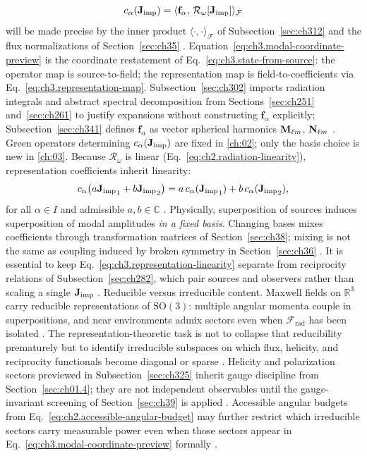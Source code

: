 \begin{equation}
\label{eq:ch3.coefficient-functional}
c_\alpha(\mathbf{J}_{\mathrm{imp}})
=
\langle \mathbf{f}_\alpha,\,\mathcal{R}_\omega[\mathbf{J}_{\mathrm{imp}}]\rangle_{\mathcal{F}}
\end{equation}
will be made precise by the inner product \(\langle\cdot,\cdot\rangle_{\mathcal{F}}\) of Subsection~\ref{sec:ch312} and the flux normalizations of Section~\ref{sec:ch35} . Equation~\eqref{eq:ch3.modal-coordinate-preview} is the coordinate restatement of Eq.~\eqref{eq:ch3.state-from-source}: the operator map is source-to-field; the representation map is field-to-coefficients via Eq.~\eqref{eq:ch3.representation-map}. Subsection~\ref{sec:ch302} imports radiation integrals and abstract spectral decomposition from Sections~\ref{sec:ch251} and~\ref{sec:ch261} to justify expansions without constructing \(\mathbf{f}_\alpha\) explicitly; Subsection~\ref{sec:ch341} defines \(\mathbf{f}_\alpha\) as vector spherical harmonics \(\mathbf{M}_{\ell m}\), \(\mathbf{N}_{\ell m}\) . Green operators determining \(c_\alpha(\mathbf{J}_{\mathrm{imp}})\) are fixed in \ref{ch:02}; only the basis choice is new in \ref{ch:03}.
Because \(\mathcal{R}_\omega\) is linear (Eq.~\eqref{eq:ch2.radiation-linearity}), representation coefficients inherit linearity:
\begin{equation}
\label{eq:ch3.representation-linearity}
c_\alpha\big(a{\mathbf{J}_{\mathrm{imp}}}_1+b{\mathbf{J}_{\mathrm{imp}}}_2\big)
=
a\,c_\alpha({\mathbf{J}_{\mathrm{imp}}}_1)+b\,c_\alpha({\mathbf{J}_{\mathrm{imp}}}_2),
\end{equation}
for all \(\alpha\in I\) and admissible \(a,b\in\mathbb{C}\) . Physically, superposition of sources induces superposition of modal amplitudes \emph{in a fixed basis}. Changing bases mixes coefficients through transformation matrices of Section~\ref{sec:ch38}; mixing is not the same as coupling induced by broken symmetry in Section~\ref{sec:ch36} . It is essential to keep Eq.~\eqref{eq:ch3.representation-linearity} separate from reciprocity relations of Subsection~\ref{sec:ch282}, which pair sources and observers rather than scaling a single \(\mathbf{J}_{\mathrm{imp}}\) .
Reducible versus irreducible content. Maxwell fields on \(\mathbb{R}^{3}\) carry reducible representations of \(\mathrm{SO}(3)\): multiple angular momenta couple in superpositions, and near environments admix sectors even when \(\mathcal{F}_{\mathrm{rad}}\) has been isolated . The representation-theoretic task is not to collapse that reducibility prematurely but to identify irreducible subspaces on which flux, helicity, and reciprocity functionals become diagonal or sparse . Helicity and polarization sectors previewed in Subsection~\ref{sec:ch325} inherit gauge discipline from Section~\ref{sec:ch01.4}; they are not independent observables until the gauge-invariant screening of Section~\ref{sec:ch39} is applied . Accessible angular budgets from Eq.~\eqref{eq:ch2.accessible-angular-budget} may further restrict which irreducible sectors carry measurable power even when those sectors appear in Eq.~\eqref{eq:ch3.modal-coordinate-preview} formally .
